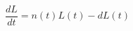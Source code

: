 \documentclass[preview]{standalone}
\begin{document}
\begin{equation*}
\frac{dL}{dt} = n(t)L(t)-dL(t)
\end{equation*}
\end{document}
